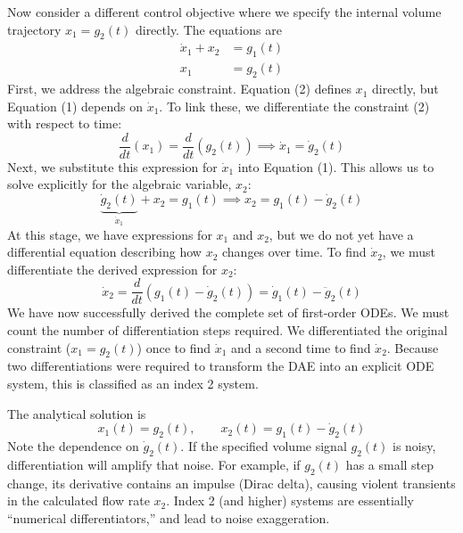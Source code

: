 Now consider a different control objective where we specify the internal volume trajectory $x_1 = g_2(t)$ directly. The equations are
\begin{align}
    \dot{x}_1 + x_2 &= g_1(t) \tag{1} \\
    x_1 &= g_2(t) \tag{2}
\end{align}
First, we address the algebraic constraint. Equation (2) defines $x_1$ directly, but Equation (1) depends on $\dot{x}_1$. To link these, we differentiate the constraint (2) with respect to time:
\begin{equation}
    \frac{d}{dt}(x_1) = \frac{d}{dt}(g_2(t)) \implies \dot{x}_1 = \dot{g}_2(t) \tag{2'}
\end{equation}
Next, we substitute this expression for $\dot{x}_1$ into Equation (1). This allows us to solve explicitly for the algebraic variable, $x_2$:
\begin{equation}
    \underbrace{\dot{g}_2(t)}_{\dot{x}_1} + x_2 = g_1(t) \implies x_2 = g_1(t) - \dot{g}_2(t)
\end{equation}
At this stage, we have expressions for $x_1$ and $x_2$, but we do not yet have a differential equation describing how $x_2$ changes over time. To find $\dot{x}_2$, we must differentiate the derived expression for $x_2$:
\begin{equation}
    \dot{x}_2 = \frac{d}{dt} \left( g_1(t) - \dot{g}_2(t) \right) = \dot{g}_1(t) - \ddot{g}_2(t)
\end{equation}
We have now successfully derived the complete set of first-order ODEs. We must count the number of differentiation steps required. We differentiated the original constraint ($x_1 = g_2(t)$) once to find $\dot{x}_1$ and a second time to find $\dot{x}_2$. Because two differentiations were required to transform the DAE into an explicit ODE system, this is classified as an index 2 system.

The analytical solution is
\begin{equation}
    x_1(t) = g_2(t), \qquad x_2(t) = g_1(t) - \dot{g}_2(t)
\end{equation}
Note the dependence on $\dot{g}_2(t)$. If the specified volume signal $g_2(t)$ is noisy, differentiation will amplify that noise. For example, if $g_2(t)$ has a small step change, its derivative contains an impulse (Dirac delta), causing violent transients in the calculated flow rate $x_2$. Index 2 (and higher) systems are essentially ``numerical differentiators,'' and lead to noise exaggeration.


